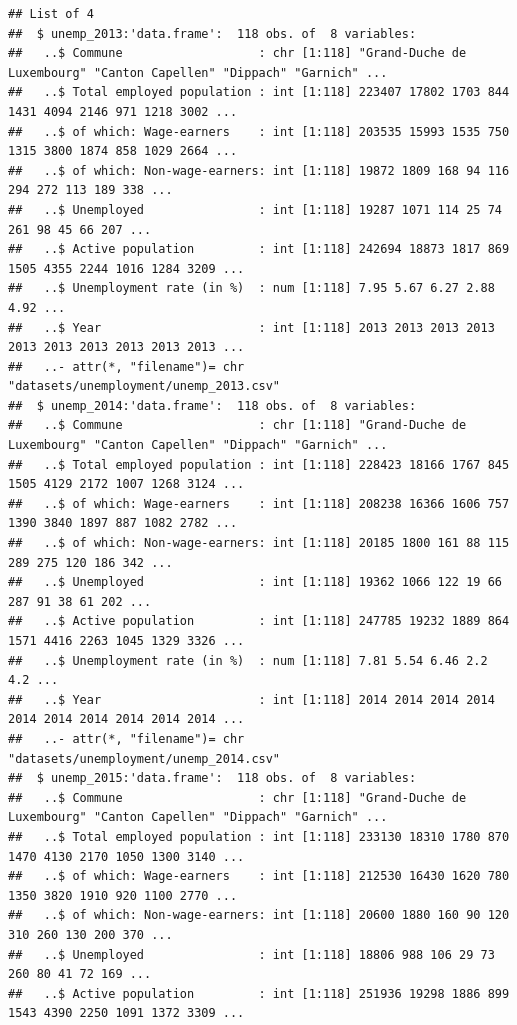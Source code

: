 \documentclass[
]{article}
\begin{document}
\begin{verbatim}
## List of 4
##  $ unemp_2013:'data.frame':  118 obs. of  8 variables:
##   ..$ Commune                   : chr [1:118] "Grand-Duche de Luxembourg" "Canton Capellen" "Dippach" "Garnich" ...
##   ..$ Total employed population : int [1:118] 223407 17802 1703 844 1431 4094 2146 971 1218 3002 ...
##   ..$ of which: Wage-earners    : int [1:118] 203535 15993 1535 750 1315 3800 1874 858 1029 2664 ...
##   ..$ of which: Non-wage-earners: int [1:118] 19872 1809 168 94 116 294 272 113 189 338 ...
##   ..$ Unemployed                : int [1:118] 19287 1071 114 25 74 261 98 45 66 207 ...
##   ..$ Active population         : int [1:118] 242694 18873 1817 869 1505 4355 2244 1016 1284 3209 ...
##   ..$ Unemployment rate (in %)  : num [1:118] 7.95 5.67 6.27 2.88 4.92 ...
##   ..$ Year                      : int [1:118] 2013 2013 2013 2013 2013 2013 2013 2013 2013 2013 ...
##   ..- attr(*, "filename")= chr "datasets/unemployment/unemp_2013.csv"
##  $ unemp_2014:'data.frame':  118 obs. of  8 variables:
##   ..$ Commune                   : chr [1:118] "Grand-Duche de Luxembourg" "Canton Capellen" "Dippach" "Garnich" ...
##   ..$ Total employed population : int [1:118] 228423 18166 1767 845 1505 4129 2172 1007 1268 3124 ...
##   ..$ of which: Wage-earners    : int [1:118] 208238 16366 1606 757 1390 3840 1897 887 1082 2782 ...
##   ..$ of which: Non-wage-earners: int [1:118] 20185 1800 161 88 115 289 275 120 186 342 ...
##   ..$ Unemployed                : int [1:118] 19362 1066 122 19 66 287 91 38 61 202 ...
##   ..$ Active population         : int [1:118] 247785 19232 1889 864 1571 4416 2263 1045 1329 3326 ...
##   ..$ Unemployment rate (in %)  : num [1:118] 7.81 5.54 6.46 2.2 4.2 ...
##   ..$ Year                      : int [1:118] 2014 2014 2014 2014 2014 2014 2014 2014 2014 2014 ...
##   ..- attr(*, "filename")= chr "datasets/unemployment/unemp_2014.csv"
##  $ unemp_2015:'data.frame':  118 obs. of  8 variables:
##   ..$ Commune                   : chr [1:118] "Grand-Duche de Luxembourg" "Canton Capellen" "Dippach" "Garnich" ...
##   ..$ Total employed population : int [1:118] 233130 18310 1780 870 1470 4130 2170 1050 1300 3140 ...
##   ..$ of which: Wage-earners    : int [1:118] 212530 16430 1620 780 1350 3820 1910 920 1100 2770 ...
##   ..$ of which: Non-wage-earners: int [1:118] 20600 1880 160 90 120 310 260 130 200 370 ...
##   ..$ Unemployed                : int [1:118] 18806 988 106 29 73 260 80 41 72 169 ...
##   ..$ Active population         : int [1:118] 251936 19298 1886 899 1543 4390 2250 1091 1372 3309 ...

\end{verbatim}
\end{document}
